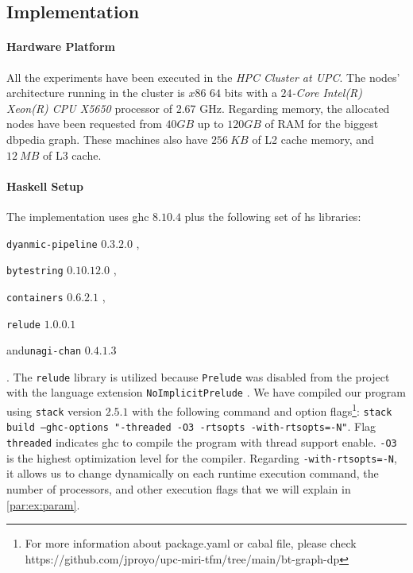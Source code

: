 \subsection{Implementation}
\paragraph{Hardware Platform} All the experiments have been executed in the \emph{HPC Cluster at UPC}. The nodes' architecture running in the cluster is $x86$ $64$ bits with a \textit{$24$-Core Intel(R) Xeon(R) CPU X5650} processor of $2.67$ GHz. 
Regarding memory, the allocated nodes have been requested from $40 GB$ up to $120 GB$ of RAM for the biggest \acrfull{dbpedia} graph. These machines also have $256\ KB$ of L2 cache memory, and $12\ MB$ of L3 cache.

\paragraph{Haskell Setup} The implementation uses \acrshort{ghc} $8.10.4$ plus the following set of \acrshort{hs} libraries:
\begin{inparaenum}[]
  \item \texttt{dyanmic-pipeline} $0.3.2.0$ \cite{dynamic-pipeline},
  \item \texttt{bytestring} $0.10.12.0$ \cite{bytestring},
  \item \texttt{containers} $0.6.2.1$ \cite{containers}, 
  \item\texttt{relude} $1.0.0.1$ \cite{relude}
  \item and\texttt{unagi-chan} $0.4.1.3$ \cite{unagi} 
\end{inparaenum}. The \texttt{relude} library is utilized because \texttt{Prelude} was disabled from the project with the language extension \texttt{NoImplicitPrelude} \cite{extensions}. 
We have compiled our program using \texttt{stack} version $2.5.1$ \cite{stack} with the following command and option flags\footnote{For more information about package.yaml or cabal file, please check https://github.com/jproyo/upc-miri-tfm/tree/main/bt-graph-dp}:
\texttt{stack build --ghc-options "-threaded -O3 -rtsopts -with-rtsopts=-N"}.
Flag \texttt{threaded} indicates \acrshort{ghc} to compile the program with thread support enable. \texttt{-O3} is the highest optimization level for the compiler.
Regarding \texttt{-with-rtsopts=-N}, it allows us to change dynamically on each runtime execution command, the number of processors, and other execution flags that we will explain in \autoref{par:ex:param}. 

